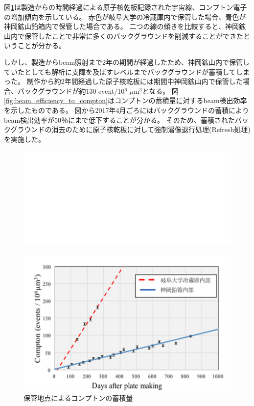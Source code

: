 \documentclass[12pt,a4paper]{jarticle}
\begin{document}
\newpage
\par
図\ref{fig:stragecompton}は製造からの時間経過による原子核乾板記録された宇宙線、コンプトン電子の増加傾向を示している。
赤色が岐阜大学の冷蔵庫内で保管した場合、青色が神岡鉱山鉛箱内で保管した場合である。
二つの線の傾きを比較すると、神岡鉱山内で保管したことで非常に多くのバックグラウンドを削減することができたということが分かる。
\par
しかし、製造からbeam照射まで2年の期間が経過したため、神岡鉱山内で保管していたとしても解析に支障を及ぼすレベルまでバックグラウンドが蓄積してしまった。
制作から約2年間経過した原子核乾板には期間中神岡鉱山内で保管した場合、バックグラウンドが約130 event/10$^6$ $\mu$m$^3$となる。
図\ref{fig:beam_efficiency_to_compton}はコンプトンの蓄積量に対するbeam検出効率を示したものである。
図から2017年4月ごろにはバックグラウンドの蓄積によりbeam検出効率が50％にまで低下することが分かる。
そのため、蓄積されたバックグラウンドの消去のために原子核乾板に対して強制潜像退行処理(Refresh処理)を実施した。
\begin{figure}[htbp]
  \centering
     \includegraphics[width=120mm]{nodata.png}
\end{figure}
\begin{figure}[htbp]
  \centering
     \includegraphics[width=120mm]{compton_strage.png}
  \caption{保管地点によるコンプトンの蓄積量\label{fig:stragecompton}}
\end{figure}
\end{document}
